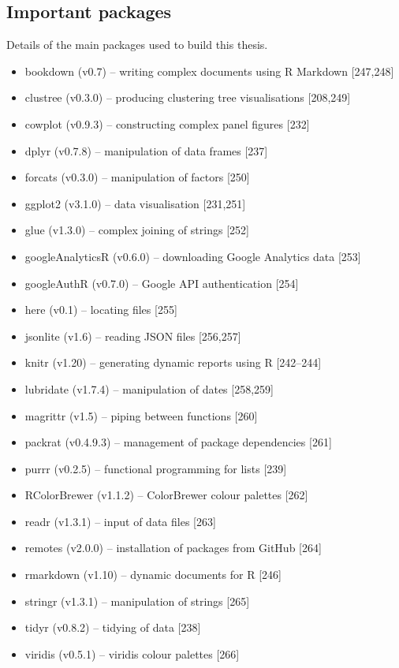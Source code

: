 \documentclass[11pt,a4paper,titlepage,twoside,openright]{style/unimelbthesis}
\theoremstyle{definition}
\theoremstyle{definition}
\theoremstyle{definition}
\theoremstyle{remark}
\begin{document}
\begin{mainmatter}
\hypertarget{important-packages}{%
\section{Important packages}\label{important-packages}}

Details of the main packages used to build this thesis.

\begin{itemize}
\tightlist
\item
  bookdown (v0.7) -- writing complex documents using R Markdown {[}247,248{]}
\item
  clustree (v0.3.0) -- producing clustering tree visualisations {[}208,249{]}
\item
  cowplot (v0.9.3) -- constructing complex panel figures {[}232{]}
\item
  dplyr (v0.7.8) -- manipulation of data frames {[}237{]}
\item
  forcats (v0.3.0) -- manipulation of factors {[}250{]}
\item
  ggplot2 (v3.1.0) -- data visualisation {[}231,251{]}
\item
  glue (v1.3.0) -- complex joining of strings {[}252{]}
\item
  googleAnalyticsR (v0.6.0) -- downloading Google Analytics data {[}253{]}
\item
  googleAuthR (v0.7.0) -- Google API authentication {[}254{]}
\item
  here (v0.1) -- locating files {[}255{]}
\item
  jsonlite (v1.6) -- reading JSON files {[}256,257{]}
\item
  knitr (v1.20) -- generating dynamic reports using R {[}242--244{]}
\item
  lubridate (v1.7.4) -- manipulation of dates {[}258,259{]}
\item
  magrittr (v1.5) -- piping between functions {[}260{]}
\item
  packrat (v0.4.9.3) -- management of package dependencies {[}261{]}
\item
  purrr (v0.2.5) -- functional programming for lists {[}239{]}
\item
  RColorBrewer (v1.1.2) -- ColorBrewer colour palettes {[}262{]}
\item
  readr (v1.3.1) -- input of data files {[}263{]}
\item
  remotes (v2.0.0) -- installation of packages from GitHub {[}264{]}
\item
  rmarkdown (v1.10) -- dynamic documents for R {[}246{]}
\item
  stringr (v1.3.1) -- manipulation of strings {[}265{]}
\item
  tidyr (v0.8.2) -- tidying of data {[}238{]}
\item
  viridis (v0.5.1) -- viridis colour palettes {[}266{]}
\end{itemize}


\end{mainmatter}
\end{document}
